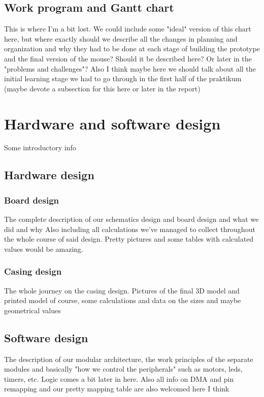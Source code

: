 \documentclass[12pt]{article}
\begin{document}
\subsection{Work program and Gantt chart}
This is where I'm a bit lost. We could include some "ideal" version of this chart here, but where exactly should we describe all the changes in planning and organization and why they had to be done at each stage of building the prototype and the final version of the mouse?  Should it be described here? Or later in the "problems and challenges"?
Also I think maybe here we should talk about all the initial learning stage we had to go through in the first half of the praktikum (maybe devote a subsection for this here or later in the report)

\section{Hardware and software design}

Some introductory info

\subsection{Hardware design}

    \subsubsection{Board design}

    The complete description of our schematics design and board design and what we did and why
    Also including all calculations we've managed to collect throughout the whole course of said design.
    Pretty pictures and some tables with calculated values would be amazing.

    \subsubsection{Casing design}

    The whole journey on the casing design. Pictures of the final 3D model and printed model of course, some calculations and data on the sizes and maybe geometrical values 
    
\subsection{Software design}

    The description of our modular architecture, the work principles of the separate modules and basically "how we control the peripherals" such as motors, leds, timers, etc. Logic comes a bit later in here.
    Also all info on DMA and pin remapping and our pretty mapping table are also welcomed here I think
\end{document}
